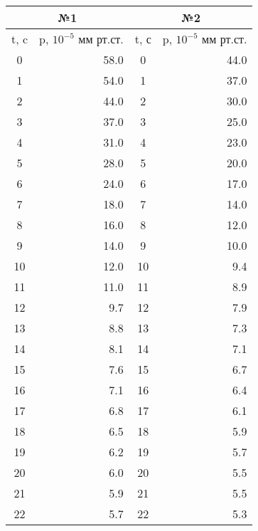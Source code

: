 \begin{table}[H]
\centering
\begin{tabular}{|cr||cr|}
\hline
\multicolumn{2}{|c||}{№1}       & \multicolumn{2}{|c|}{№2}       \\ \hline
\multicolumn{1}{|c|}{t, c} & p, $10^{-5}$ мм рт.ст. & \multicolumn{1}{c|}{t, с} & p, $10^{-5}$ мм рт.ст. \\ \hline \hline
\multicolumn{1}{|c|}{0}  & 58.0  & \multicolumn{1}{c|}{0}  & 44.0  \\ \hline
\multicolumn{1}{|c|}{1}  & 54.0  & \multicolumn{1}{c|}{1}  & 37.0  \\ \hline
\multicolumn{1}{|c|}{2}  & 44.0  & \multicolumn{1}{c|}{2}  & 30.0  \\ \hline
\multicolumn{1}{|c|}{3}  & 37.0  & \multicolumn{1}{c|}{3}  & 25.0  \\ \hline
\multicolumn{1}{|c|}{4}  & 31.0  & \multicolumn{1}{c|}{4}  & 23.0  \\ \hline
\multicolumn{1}{|c|}{5}  & 28.0  & \multicolumn{1}{c|}{5}  & 20.0  \\ \hline
\multicolumn{1}{|c|}{6}  & 24.0  & \multicolumn{1}{c|}{6}  & 17.0  \\ \hline
\multicolumn{1}{|c|}{7}  & 18.0  & \multicolumn{1}{c|}{7}  & 14.0  \\ \hline
\multicolumn{1}{|c|}{8}  & 16.0  & \multicolumn{1}{c|}{8}  & 12.0  \\ \hline
\multicolumn{1}{|c|}{9}  & 14.0  & \multicolumn{1}{c|}{9}  & 10.0  \\ \hline
\multicolumn{1}{|c|}{10} & 12.0  & \multicolumn{1}{c|}{10} & 9.4 \\ \hline
\multicolumn{1}{|c|}{11} & 11.0  & \multicolumn{1}{c|}{11} & 8.9 \\ \hline
\multicolumn{1}{|c|}{12} & 9.7 & \multicolumn{1}{c|}{12} & 7.9 \\ \hline
\multicolumn{1}{|c|}{13} & 8.8 & \multicolumn{1}{c|}{13} & 7.3 \\ \hline
\multicolumn{1}{|c|}{14} & 8.1 & \multicolumn{1}{c|}{14} & 7.1 \\ \hline
\multicolumn{1}{|c|}{15} & 7.6 & \multicolumn{1}{c|}{15} & 6.7 \\ \hline
\multicolumn{1}{|c|}{16} & 7.1 & \multicolumn{1}{c|}{16} & 6.4 \\ \hline
\multicolumn{1}{|c|}{17} & 6.8 & \multicolumn{1}{c|}{17} & 6.1 \\ \hline
\multicolumn{1}{|c|}{18} & 6.5 & \multicolumn{1}{c|}{18} & 5.9 \\ \hline
\multicolumn{1}{|c|}{19} & 6.2 & \multicolumn{1}{c|}{19} & 5.7 \\ \hline
\multicolumn{1}{|c|}{20} & 6.0  & \multicolumn{1}{c|}{20} & 5.5 \\ \hline
\multicolumn{1}{|c|}{21} & 5.9 & \multicolumn{1}{c|}{21} & 5.5 \\ \hline
\multicolumn{1}{|c|}{22} & 5.7 & \multicolumn{1}{c|}{22} & 5.3 \\ \hline
\end{tabular}
\end{table}

